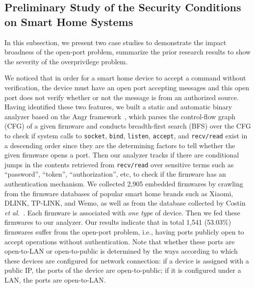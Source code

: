 \documentclass[letterpaper,12pt]{article}
\begin{document}
\subsection{Preliminary Study of the Security Conditions on Smart Home Systems}
In this subsection, we present two case studies to demonstrate the impact broadness of the open-port problem, summarize the prior research results to show the severity of the overprivilege problem.

We noticed that in order for a smart home device to accept a command without verification, the device must have an open port accepting messages and this open port does not verify whether or not the message is from an authorized source. Having identified these two features, we built a static and automatic binary analyzer based on the Angr framework~\cite{shoshitaishvili2016state}\cite{stephens2016driller}\cite{shoshitaishvili2015firmalice}, which parses the control-flow graph (CFG) of a given firmware and conducts breadth-first search (BFS) over the CFG to check if system calls to \texttt{socket}, \texttt{bind}, \texttt{listen}, \texttt{accept}, and \texttt{recv/read} exist in a descending order since they are the determining factors to tell whether the given firmware opens a port. Then our analyzer tracks if there are conditional jumps in the contents retrieved from \texttt{recv/read} over sensitive terms such as ``password'', ``token'', ``authorization'', etc, to check if the firmware has an authentication mechanism. We collected 2,905 embedded firmwares by crawling from the firmware databases of popular smart home brands such as Xiaomi, DLINK, TP-LINK, and Wemo, as well as from the database collected by Costin \emph{et al.}~\cite{costin2014large}. Each firmware is associated with \emph{one type} of device. Then we fed these firmwares to our analyzer. Our results indicate that in total 1,541 (53.03\%) firmwares suffer from the open-port problem, i.e., having ports publicly open to accept operations without authentication. Note that whether these ports are open-to-LAN or open-to-public is determined by the ways according to which these devices are configured for network connection: if a device is assigned with a public IP, the ports of the device are open-to-public; if it is configured under a LAN, the ports are open-to-LAN. 
\end{document}
